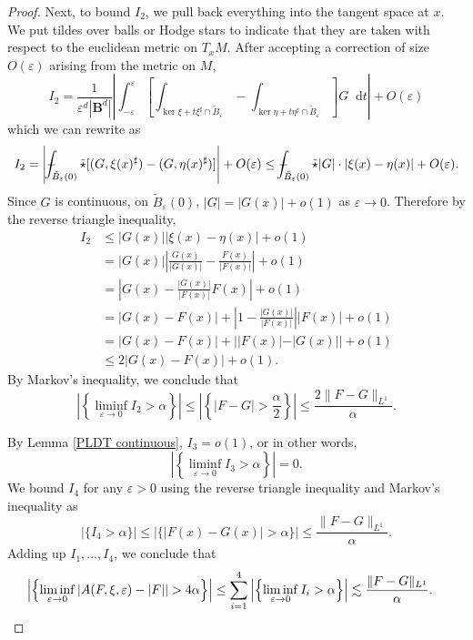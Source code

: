 \documentclass[reqno,11pt]{amsart}
\newcommand{\Ball}{\mathbf{B}}
\newcommand*\dif{\mathop{}\!\mathrm{d}}
\theoremstyle{definition}
\numberwithin{equation}{section}
\def\Xint#1{\mathchoice
{\XXint\displaystyle\textstyle{#1}}%
{\XXint\textstyle\scriptstyle{#1}}%
{\XXint\scriptstyle\scriptscriptstyle{#1}}%
{\XXint\scriptscriptstyle\scriptscriptstyle{#1}}%
\!\int}
\def\XXint#1#2#3{{\setbox0=\hbox{$#1{#2#3}{\int}$ }
\vcenter{\hbox{$#2#3$ }}\kern-.6\wd0}}
\def\dashint{\Xint-}
\begin{document}
\begin{proof}
Next, to bound $I_2$, we pull back everything into the tangent space at $x$.
We put tildes over balls or Hodge stars to indicate that they are taken with respect to the euclidean metric on $T_x M$.
After accepting a correction of size $O(\varepsilon)$ arising from the metric on $M$, 
$$I_2 = \frac{1}{\varepsilon^d |\Ball^d|} \left|\int_{-\varepsilon}^\varepsilon \left[\int_{\ker \xi + t\xi^\sharp \cap \tilde B_\varepsilon} - \int_{\ker \eta + t\eta^\sharp \cap \tilde B_\varepsilon}\right] G \dif t\right| + O(\varepsilon)$$
which we can rewrite as
$$I_2 = \left|\dashint_{\tilde B_\varepsilon(0)} \tilde \star [(G, \xi(x)^\sharp) - (G, \eta(x)^\sharp)]\right| + O(\varepsilon) \leq \dashint_{\tilde B_\varepsilon(0)} \tilde \star |G| \cdot |\xi(x) - \eta(x)| + O(\varepsilon).$$
Since $G$ is continuous, on $\tilde B_\varepsilon(0)$, $|G| = |G(x)| + o(1)$ as $\varepsilon \to 0$.
Therefore by the reverse triangle inequality,
\begin{align*}
I_2
&\leq |G(x)| |\xi(x) - \eta(x)| + o(1) \\
&= |G(x)| \left|\frac{G(x)}{|G(x)|} - \frac{F(x)}{|F(x)|}\right| + o(1) \\
&= \left|G(x) - \frac{|G(x)|}{|F(x)|} F(x)\right| + o(1) \\
&= |G(x) - F(x)| + \left|1 - \frac{|G(x)|}{|F(x)|}\right| |F(x)| + o(1)\\
&= |G(x) - F(x)| + ||F(x)| - |G(x)|| + o(1) \\
&\leq 2|G(x) - F(x)| + o(1).
\end{align*}
By Markov's inequality, we conclude that 
$$\left|\left\{\liminf_{\varepsilon \to 0} I_2 > \alpha\right\}\right| \leq \left|\left\{|F - G| > \frac{\alpha}{2}\right\}\right| \leq \frac{2\|F - G\|_{L^1}}{\alpha}.$$

By Lemma \ref{PLDT continuous}, $I_3 = o(1)$, or in other words,
$$\left|\left\{\liminf_{\varepsilon \to 0} I_3 > \alpha\right\}\right| = 0.$$
We bound $I_4$ for any $\varepsilon > 0$ using the reverse triangle inequality and Markov's inequality as 
$$|\{I_4 > \alpha\}| \leq |\{|F(x) - G(x)| > \alpha\}| \leq \frac{\|F - G\|_{L^1}}{\alpha}.$$
Adding up $I_1, \dots, I_4$, we conclude that 
\begin{align*}
\left|\left\{\liminf_{\varepsilon \to 0} |A(F, \xi, \varepsilon) - |F|| > 4\alpha\right\}\right| \leq \sum_{i=1}^4 \left|\left\{\liminf_{\varepsilon \to 0} I_i > \alpha\right\}\right| &\lesssim \frac{\|F - G\|_{L^1}}{\alpha}. \qedhere 
\end{align*}
\end{proof}
\end{document}

